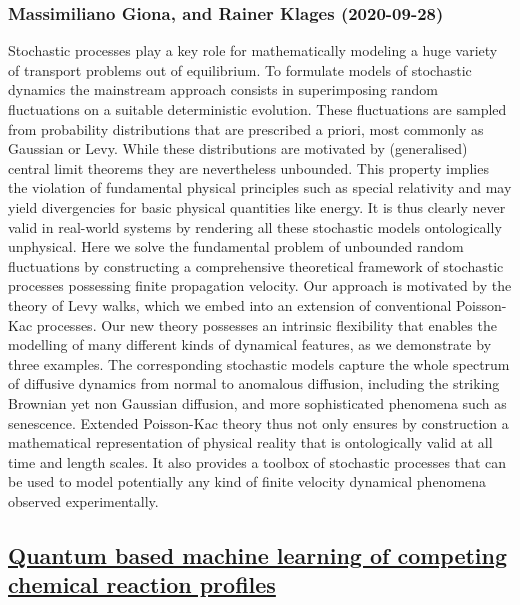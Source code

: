 \subsubsection*{Massimiliano Giona, and Rainer Klages (2020-09-28)}
Stochastic processes play a key role for mathematically modeling a huge
variety of transport problems out of equilibrium. To formulate models of
stochastic dynamics the mainstream approach consists in superimposing random
fluctuations on a suitable deterministic evolution. These fluctuations are
sampled from probability distributions that are prescribed a priori, most
commonly as Gaussian or Levy. While these distributions are motivated by
(generalised) central limit theorems they are nevertheless unbounded. This
property implies the violation of fundamental physical principles such as
special relativity and may yield divergencies for basic physical quantities
like energy. It is thus clearly never valid in real-world systems by rendering
all these stochastic models ontologically unphysical. Here we solve the
fundamental problem of unbounded random fluctuations by constructing a
comprehensive theoretical framework of stochastic processes possessing finite
propagation velocity. Our approach is motivated by the theory of Levy walks,
which we embed into an extension of conventional Poisson-Kac processes. Our new
theory possesses an intrinsic flexibility that enables the modelling of many
different kinds of dynamical features, as we demonstrate by three examples. The
corresponding stochastic models capture the whole spectrum of diffusive
dynamics from normal to anomalous diffusion, including the striking Brownian
yet non Gaussian diffusion, and more sophisticated phenomena such as
senescence. Extended Poisson-Kac theory thus not only ensures by construction a
mathematical representation of physical reality that is ontologically valid at
all time and length scales. It also provides a toolbox of stochastic processes
that can be used to model potentially any kind of finite velocity dynamical
phenomena observed experimentally.

\subsection*{\href{http://arxiv.org/abs/2009.13429v1}{Quantum based machine learning of competing chemical reaction profiles}}
